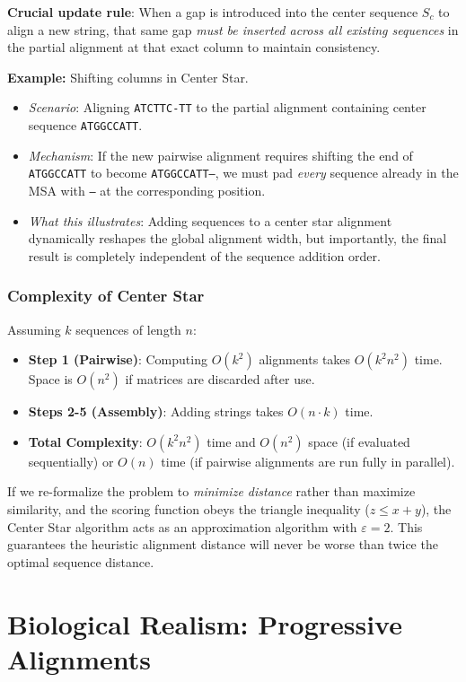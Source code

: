\sta \textbf{Crucial update rule}: When a gap is introduced into the center sequence $S_c$ to align a new string, that same gap \textit{must be inserted across all existing sequences} in the partial alignment at that exact column to maintain consistency.

\textbf{Example:} Shifting columns in Center Star.
\begin{itemize}
    \item \textit{Scenario}: Aligning \texttt{ATCTTC-TT} to the partial alignment containing center sequence \texttt{ATGGCCATT}. 
    \item \textit{Mechanism}: If the new pairwise alignment requires shifting the end of \texttt{ATGGCCATT} to become \texttt{ATGGCCATT--}, we must pad \textit{every} sequence already in the MSA with \texttt{--} at the corresponding position. 
    \item \textit{What this illustrates}: Adding sequences to a center star alignment dynamically reshapes the global alignment width, but importantly, the final result is completely independent of the sequence addition order.
\end{itemize}

\subsubsection{Complexity of Center Star}

Assuming $k$ sequences of length $n$:
\begin{itemize}
    \item \textbf{Step 1 (Pairwise)}: Computing $O(k^2)$ alignments takes $O(k^2 n^2)$ time. Space is $O(n^2)$ if matrices are discarded after use.
    \item \textbf{Steps 2-5 (Assembly)}: Adding strings takes $O(n \cdot k)$ time.
    \item \textbf{Total Complexity}: $O(k^2 n^2)$ time and $O(n^2)$ space (if evaluated sequentially) or $O(n)$ time (if pairwise alignments are run fully in parallel).
\end{itemize}

If we re-formalize the problem to \textit{minimize distance} rather than maximize similarity, and the scoring function obeys the triangle inequality ($z \le x + y$), the Center Star algorithm acts as an approximation algorithm with $\varepsilon = 2$. This guarantees the heuristic alignment distance will never be worse than twice the optimal sequence distance.

\section{Biological Realism: Progressive Alignments}

